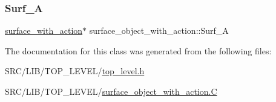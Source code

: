 \subsubsection{\texorpdfstring{Surf\+\_\+A}{Surf\_A}}
{\footnotesize\ttfamily \mbox{\hyperlink{classsurface__with__action}{surface\+\_\+with\+\_\+action}}$\ast$ surface\+\_\+object\+\_\+with\+\_\+action\+::\+Surf\+\_\+A}



The documentation for this class was generated from the following files\+:\begin{DoxyCompactItemize}
\item 
S\+R\+C/\+L\+I\+B/\+T\+O\+P\+\_\+\+L\+E\+V\+E\+L/\mbox{\hyperlink{top__level_8h}{top\+\_\+level.\+h}}\item 
S\+R\+C/\+L\+I\+B/\+T\+O\+P\+\_\+\+L\+E\+V\+E\+L/\mbox{\hyperlink{surface__object__with__action_8_c}{surface\+\_\+object\+\_\+with\+\_\+action.\+C}}\end{DoxyCompactItemize}
